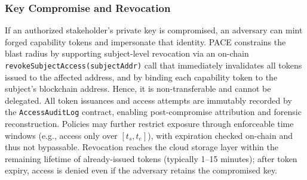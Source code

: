\documentclass[pdflatex,sn-mathphys-num]{sn-jnl}
\begin{document}



\subsubsection{Key Compromise and Revocation}
If an authorized stakeholder's private key is compromised, an adversary can mint forged capability tokens and impersonate that identity. PACE constrains the blast radius by supporting subject-level revocation via an on-chain \texttt{revokeSubjectAccess(subjectAddr)} call that immediately invalidates all tokens issued to the affected address, and by binding each capability token to the subject's blockchain address. Hence, it is non-transferable and cannot be delegated. All token issuances and access attempts are immutably recorded by the \texttt{AccessAuditLog} contract, enabling post-compromise attribution and forensic reconstruction. Policies may further restrict exposure through enforceable time windows (e.g., access only over $[t_s,t_e]$), with expiration checked on-chain and thus not bypassable. Revocation reaches the cloud storage layer within the remaining lifetime of already-issued tokens (typically 1--15 minutes); after token expiry, access is denied even if the adversary retains the compromised key.
\end{document}
